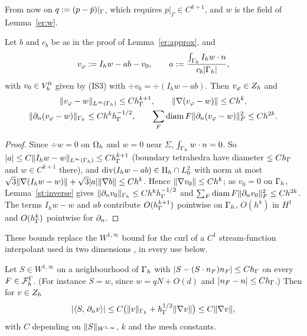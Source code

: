 From now on $q:=(p-\bar p)|_\Gamma$, which requires $p|_\Gamma\in C^{k+1}$, and $w$ is the field of Lemma~\ref{er:w}.

\begin{lemma}\label{er:vphi}
Let $b$ and $c_b$ be as in the proof of Lemma~\ref{er:approx}, and
\[
v_\varphi:=I_hw-ab-v_0,\qquad a:=\frac{\int_{\Gamma_h}I_hw\cdot n}{c_b|\Gamma_h|},
\]
with $v_0\in V_h^0$ given by (IS3) with $\div v_0=\div(I_hw-ab)$. Then $v_\varphi\in Z_h$ and
\begin{gather*}
\lVert v_\varphi-w\rVert_{L^\infty(\Gamma_h)}\le Ch_\Gamma^{k+1},\qquad\lVert \nabla(v_\varphi-w)\rVert\le Ch^k,\\
\lVert \partial_n(v_\varphi-w)\rVert_{\Gamma_h}\le Ch^kh_\Gamma^{-1/2},\qquad\sum_F\operatorname{diam} F\lVert \partial_n(v_\varphi-w)\rVert^2_F\le Ch^{2k}.
\end{gather*}
\end{lemma}

\begin{proof}
Since $\div w=0$ on $\Omega_h$ and $w=0$ near $\Sigma$, $\int_{\Gamma_h}w\cdot n=0$. So $|a|\le C\lVert I_hw-w\rVert_{L^\infty(\Gamma_h)}\le Ch_\Gamma^{k+1}$ (boundary tetrahedra have diameter $\le Ch_\Gamma$ and $w\in C^{k+1}$ there), and $\operatorname{div}(I_hw-ab)\in\Pi_h\cap L^2_0$ with norm at most $\sqrt3\lVert \nabla(I_hw-w)\rVert+\sqrt3|a|\lVert \nabla b\rVert\le Ch^k$. Hence $\lVert \nabla v_0\rVert\le Ch^k$; as $v_0=0$ on $\Gamma_h$, Lemma~\ref{st:inverse} gives $\lVert \partial_n v_0\rVert_{\Gamma_h}\le Ch^kh_\Gamma^{-1/2}$ and $\sum_F\operatorname{diam} F\lVert \partial_n v_0\rVert^2_F\le Ch^{2k}$. The terms $I_hw-w$ and $ab$ contribute $O(h_\Gamma^{k+1})$ pointwise on $\Gamma_h$, $O(h^k)$ in $H^1$ and $O(h_\Gamma^k)$ pointwise for $\partial_n$.
\end{proof}

These bounds replace the $W^{1,\infty}$ bound for the curl of a $C^1$ stream-function interpolant used in two dimensions \cite{PadhiLong2D}, in every use below.

\begin{lemma}\label{er:cancel}
Let $S\in W^{1,\infty}$ on a neighbourhood of $\Gamma_h$ with $|S-(S\cdot n_F)n_F|\le Ch_\Gamma$ on every $F\in\mathcal F_h^\Gamma$. (For instance $S=w$, since $w=qN+O(d)$ and $|n_F-n|\le Ch_\Gamma$.) Then for $v\in Z_h$
\[
|\langle S,\, \partial_n v\rangle|\le C\bigl(\lVert v\rVert_{\Gamma_h}+h_\Gamma^{1/2}\lVert \nabla v\rVert\bigr)\le C\lVert \nabla v\rVert,
\]
with $C$ depending on $\lVert S\rVert_{W^{1,\infty}}$, $k$ and the mesh constants.
\end{lemma}

